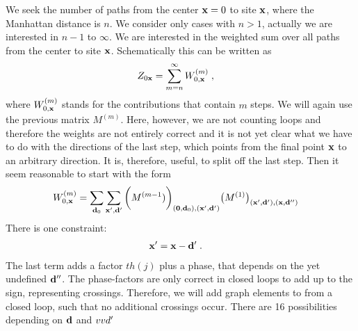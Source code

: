 We seek the number of paths from the center $\mathbf x=0$ to site $\mathbf x$, where the Manhattan distance is 
$n$. We consider only cases with $n>1$, actually we are interested in $n-1$ to $\infty$. 
We are interested in the weighted sum over all paths from the center to site $\mathbf x$. Schematically this can be written as
%
\begin{align*}
Z_{0 \mathbf x} &= \sum_{m=n}^{\infty}  W^{(m)}_{0,\mathbf x}\;,
\end{align*}
%
where $W^{(m)}_{0,\mathbf x}$ stands for the contributions that contain $m$ steps. We will again use the previous matrix $M^{(m)}$. Here, however, we are not counting loops and therefore the weights are not entirely correct
and it is not yet clear what we have to do with the directions of the last step, which points from the final point $\mathbf x$ to an arbitrary direction. It is, therefore, useful, to split off the last step. Then it seem reasonable to 
start with the form
%
\begin{align*}
W^{(m)}_{0,\mathbf x} &= \sum_{\mathbf d_{0}} \sum_{\mathbf x',\mathbf d'}  \bigg(M^{(m-1})\bigg)_{(\mathbf 0,\mathbf d_{0}),(\mathbf x',\mathbf d')}  \big(M^{(1)}\big)_{(\mathbf x',\mathbf d'),(\mathbf x,\mathbf d'')}
\end{align*}
%
There is one constraint:
%
\begin{align*}
\mathbf x'  &= \mathbf x - \mathbf d'\;.
\end{align*}
%
The last term adds a factor $th(j)$ plus a phase, that depends on the yet undefined $\mathbf d''$.
The phase-factors are only correct in closed loops to add up to the sign, representing crossings.
Therefore, we will add graph elements to from a closed loop, such that no additional crossings occur.
There are 16 possibilities depending on $\mathbf d$ and $\\vv d'$
%
%
%
%


